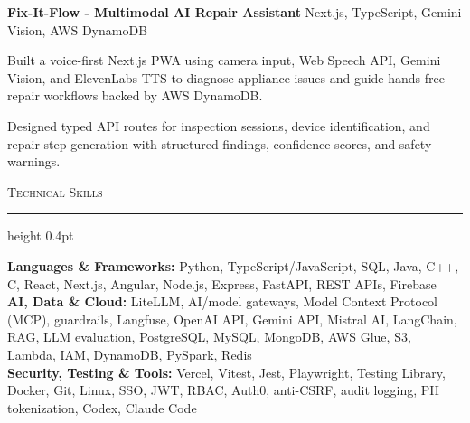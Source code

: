 \documentclass[letterpaper,11pt]{article}
\newcommand{\resumesection}[1]{%
  \par\vspace{2pt}%
  {\large\scshape #1}\par\vspace{2pt}%
  \hrule height 0.4pt\vspace{2pt}%
}
\newcommand{\projectHeading}[2]{
  \textbf{#1} \hfill #2
}
\begin{document}
\vspace{-4pt}
\projectHeading{Fix-It-Flow - Multimodal AI Repair Assistant}{Next.js, TypeScript, Gemini Vision, AWS DynamoDB}
\begin{tightitemize}
  \item Built a voice-first Next.js PWA using camera input, Web Speech API, Gemini Vision, and ElevenLabs TTS to diagnose appliance issues and guide hands-free repair workflows backed by AWS DynamoDB.
  \item Designed typed API routes for inspection sessions, device identification, and repair-step generation with structured findings, confidence scores, and safety warnings.
\end{tightitemize}

\resumesection{Technical Skills}
\textbf{Languages \& Frameworks:} Python, TypeScript/JavaScript, SQL, Java, C++, C, React, Next.js, Angular, Node.js, Express, FastAPI, REST APIs, Firebase\\
\textbf{AI, Data \& Cloud:} LiteLLM, AI/model gateways, Model Context Protocol (MCP), guardrails, Langfuse, OpenAI API, Gemini API, Mistral AI, LangChain, RAG, LLM evaluation, PostgreSQL, MySQL, MongoDB, AWS Glue, S3, Lambda, IAM, DynamoDB, PySpark, Redis\\
\textbf{Security, Testing \& Tools:} Vercel, Vitest, Jest, Playwright, Testing Library, Docker, Git, Linux, SSO, JWT, RBAC, Auth0, anti-CSRF, audit logging, PII tokenization, Codex, Claude Code
\end{document}
